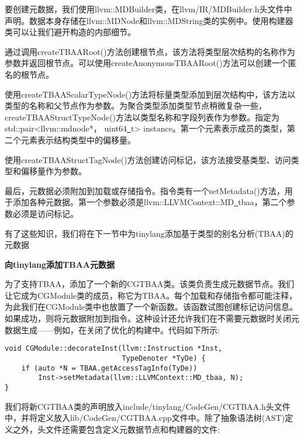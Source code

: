要创建元数据，我们使用llvm::MDBuilder类，在llvm/IR/MDBuilder.h头文件中声明。数据本身存储在llvm::MDNode和llvm::MDString类的实例中。使用构建器类可以让我们避开构造的内部细节。\par

通过调用createTBAARoot()方法创建根节点，该方法将类型层次结构的名称作为参数并返回根节点。可以使用createAnonymousTBAARoot()方法可以创建一个匿名的根节点。\par

使用createTBAAScalarTypeNode()方法将标量类型添加到层次结构中，该方法以类型的名称和父节点作为参数。为聚合类型添加类型节点稍微复杂一些，createTBAAStructTypeNode()方法以类型名称和字段列表作为参数。指定为std::pair<llvm::mdnode*， uint64\underline{~}t> instance。第一个元素表示成员的类型，第二个元素表示结构类型中的偏移量。\par

使用createTBAAStructTagNode()方法创建访问标记，该方法接受基类型、访问类型和偏移量作为参数。\par

最后，元数据必须附加到加载或存储指令。指令类有一个setMetadata()方法，用于添加各种元数据。第一个参数必须是llvm::LLVMContext::MD\underline{~}tbaa，第二个参数必须是访问标记。\par

有了这些知识，我们将在下一节中为tinylang添加基于类型的别名分析(TBAA)的元数据\par

\hspace*{\fill} \par %
\textbf{向tinylang添加TBAA元数据}

为了支持TBAA，添加了一个新的CGTBAA类。该类负责生成元数据节点。我们让它成为CGModule类的成员，称它为TBAA。每个加载和存储指令都可能注释，为此我们在CGModule类中也放置了一个新函数。该函数试图创建标记访问信息。如果成功，则将元数据附加到指令。这种设计还允许我们在不需要元数据时关闭元数据生成——例如，在关闭了优化的构建中。代码如下所示:\par

\begin{lstlisting}[caption={}]
void CGModule::decorateInst(llvm::Instruction *Inst,
							TypeDenoter *TyDe) {
	if (auto *N = TBAA.getAccessTagInfo(TyDe))
		Inst->setMetadata(llvm::LLVMContext::MD_tbaa, N);
}
\end{lstlisting}

我们将新CGTBAA类的声明放入include/tinylang/CodeGen/CGTBAA.h头文件中，并将定义放入lib/CodeGen/CGTBAA.cpp文件中。除了抽象语法树(AST)定义之外，头文件还需要包含定义元数据节点和构建器的文件:\par

